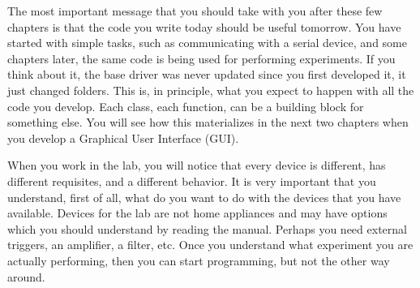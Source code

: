 The most important message that you should take with you after these few
chapters is that the code you write today should be useful tomorrow.
You have started with simple tasks, such as communicating with a serial
device, and some chapters later, the same code is being used for
performing experiments. If you think about it, the base driver was never
updated since you first developed it, it just changed folders. This is,
in principle, what you expect to happen with all the code you develop.
Each class, each function, can be a building block for something else.
You will see how this materializes in the next two chapters when you
develop a Graphical User Interface ({GUI}).

When you work in the lab, you will notice that every device is
different, has different requisites, and a different behavior. It is
very important that you understand, first of all, what do you want to do
with the devices that you have available. Devices for the lab are not
home appliances and may have options which you should understand by
reading the manual. Perhaps you need external triggers, an amplifier, a
filter, etc. Once you understand what experiment you are actually
performing, then you can start programming, but not the other
way around.
